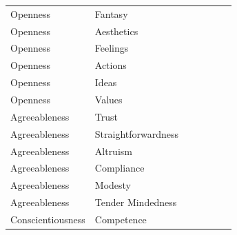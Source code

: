 \documentclass{article}\usepackage[]{graphicx}\usepackage[]{color}
\begin{document}
\begin{table}
\begin{tabular}[t]{lllllll}
Openness & Fantasy & \cellcolor{white}{0.25} & \cellcolor{white}{-0.27} & \cellcolor{white}{-0.07} & \cellcolor{white}{0.05} & \cellcolor{yellow}{0.57}\\
Openness & Aesthetics & \cellcolor{white}{-0.02} & \cellcolor{white}{-0.02} & \cellcolor{white}{0.18} & \cellcolor{white}{0.11} & \cellcolor{yellow}{0.7}\\
Openness & Feelings & \cellcolor{yellow}{0.54} & \cellcolor{white}{0.14} & \cellcolor{white}{0.27} & \cellcolor{white}{-0.05} & \cellcolor{white}{0.43}\\
\addlinespace
Openness & Actions & \cellcolor{white}{0.25} & \cellcolor{white}{-0.35} & \cellcolor{white}{-0.19} & \cellcolor{white}{0.15} & \cellcolor{white}{0.44}\\
Openness & Ideas & \cellcolor{white}{-0.04} & \cellcolor{white}{0.11} & \cellcolor{white}{-0.24} & \cellcolor{white}{-0.1} & \cellcolor{yellow}{0.61}\\
Openness & Values & \cellcolor{white}{0.11} & \cellcolor{white}{-0.15} & \cellcolor{white}{0.07} & \cellcolor{white}{0.12} & \cellcolor{yellow}{0.52}\\
Agreeableness & Trust & \cellcolor{white}{0.33} & \cellcolor{white}{0.07} & \cellcolor{white}{-0.08} & \cellcolor{yellow}{0.53} & \cellcolor{white}{0.07}\\
Agreeableness & Straightforwardness & \cellcolor{white}{-0.04} & \cellcolor{white}{0.26} & \cellcolor{white}{0.18} & \cellcolor{yellow}{0.54} & \cellcolor{white}{-0.06}\\
\addlinespace
Agreeableness & Altruism & \cellcolor{yellow}{0.51} & \cellcolor{white}{0.23} & \cellcolor{white}{0.07} & \cellcolor{yellow}{0.56} & \cellcolor{white}{0.09}\\
Agreeableness & Compliance & \cellcolor{white}{-0.09} & \cellcolor{white}{-0.03} & \cellcolor{white}{0.01} & \cellcolor{yellow}{0.78} & \cellcolor{white}{0.13}\\
Agreeableness & Modesty & \cellcolor{white}{-0.05} & \cellcolor{white}{0.09} & \cellcolor{white}{0.41} & \cellcolor{white}{0.38} & \cellcolor{white}{0}\\
Agreeableness & Tender Mindedness & \cellcolor{white}{0.23} & \cellcolor{white}{-0.05} & \cellcolor{white}{0.23} & \cellcolor{white}{0.33} & \cellcolor{white}{0.28}\\
Conscientiousness & Competence & \cellcolor{white}{0.19} & \cellcolor{yellow}{0.68} & \cellcolor{white}{-0.38} & \cellcolor{white}{0.02} & \cellcolor{white}{0}\\

\end{tabular}
\end{table}
\end{document}

